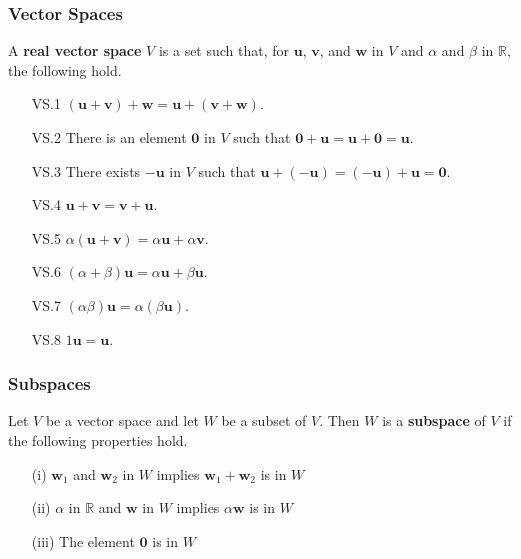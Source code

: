 \documentclass{beamer}
\begin{document}
\begin{frame}
\frametitle{Vector Spaces}
\begin{Definition}
A {\bf real vector space} $V$ is a set such that, for ${\boldsymbol u}$, ${\boldsymbol v}$, and ${\boldsymbol w}$ in $V$ and $\alpha$ and $\beta$ in $\mathbb{R}$, the following hold.
{
\small
\begin{multicols}{2}
\begin{enumerate}
\item[VS.1] $({\boldsymbol u} + {\boldsymbol v}) + {\boldsymbol w} = {\boldsymbol u} + ({\boldsymbol v} + {\boldsymbol w})$.
\item[VS.2] There is an element ${\boldsymbol 0}$ in $V$ such that
$
{\boldsymbol 0} + {\boldsymbol u} = {\boldsymbol u} + {\boldsymbol 0} = {\boldsymbol u}.
$
\item[VS.3] There exists ${\boldsymbol -}{\boldsymbol u}$ in $V$ such that
$
{\boldsymbol u} + ({\boldsymbol -}{\boldsymbol u}) = ({\boldsymbol -}{\boldsymbol u}) + {\boldsymbol u} = {\boldsymbol 0}.
$
\item[VS.4] ${\boldsymbol u} + {\boldsymbol v} = {\boldsymbol v} + {\boldsymbol u}$.
\item[VS.5] $\alpha({\boldsymbol u} + {\boldsymbol v}) = \alpha {\boldsymbol u} + \alpha {\boldsymbol v}$.
\item[VS.6] $(\alpha + \beta) {\boldsymbol u} = \alpha {\boldsymbol u} + \beta {\boldsymbol u}$.
\item[VS.7] $(\alpha\beta) {\boldsymbol u} = \alpha(\beta {\boldsymbol u})$.
\item[VS.8] $1 {\boldsymbol u} = {\boldsymbol u}$.
\end{enumerate}
\end{multicols}
}
\end{Definition}
\end{frame}

\begin{frame}
\frametitle{Subspaces}
\begin{Definition}
Let $V$ be a vector space and let $W$ be a subset of $V$. Then $W$ is a {\bf subspace} of $V$ if the following properties hold.
\begin{enumerate}
\item[(i)] ${\boldsymbol w_1}$ and ${\boldsymbol w_2}$ in $W$ implies ${\boldsymbol w_1} + {\boldsymbol w_2}$ is in $W$
\item[(ii)] $\alpha$ in $\mathbb{R}$ and ${\boldsymbol w}$ in $W$ implies $\alpha {\boldsymbol w}$ is in $W$
\item[(iii)] The element ${\boldsymbol 0}$ is in $W$
\end{enumerate}
\end{Definition}

\end{frame}
\end{document}
